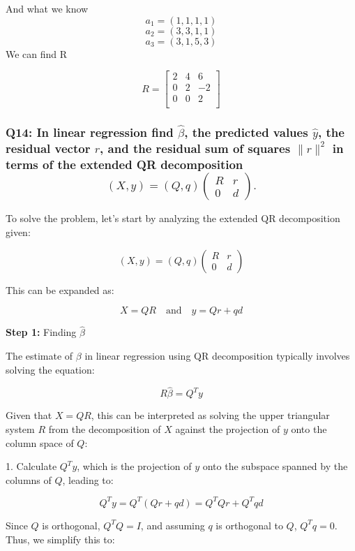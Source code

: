 \documentclass[8pt]{article}
\begin{document}
And what we know
\[
a_{1} = (1,1,1,1)
\]
\[
a_{2} = (3,3,1,1)
\]
\[
a_{3} = (3,1,5,3)
\]
We can find R

\[
  R=
  \left[ {\begin{array}{ccc}
   2 & 4 & 6\\
   0 & 2 & -2\\
   0 & 0 & 2 \\
  \end{array} } \right]
\]

\subsubsection*{Q14: In linear regression find \(\hat{\beta}\), the predicted values \(\hat{y}\), the residual vector \(r\), and the residual sum of squares \(\|r\|^2\) in terms of the extended QR decomposition
\[
(X, y) = (Q, q) \left(\begin{array}{cc}
R & r \\
0 & d
\end{array}\right).
\]}

To solve the problem, let's start by analyzing the extended QR decomposition given:

\[ (X, y) = (Q, q) \left(\begin{array}{cc} R & r \\ 0 & d \end{array}\right) \]

This can be expanded as:

\[ X = QR \quad \text{and} \quad y = Qr + qd \]

\textbf{Step 1:} Finding \(\hat{\beta}\)

The estimate of \(\beta\) in linear regression using QR decomposition typically involves solving the equation:

\[ R\hat{\beta} = Q^T y \]

Given that \( X = QR \), this can be interpreted as solving the upper triangular system \( R \) from the decomposition of \( X \) against the projection of \( y \) onto the column space of \( Q \):

1. Calculate \( Q^T y \), which is the projection of \( y \) onto the subspace spanned by the columns of \( Q \), leading to:

\[ Q^T y = Q^T (Qr + qd) = Q^T Q r + Q^T q d \]

Since \( Q \) is orthogonal, \( Q^T Q = I \), and assuming \( q \) is orthogonal to \( Q \), \( Q^T q = 0 \). Thus, we simplify this to:
\end{document}
